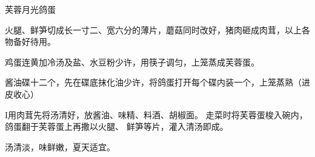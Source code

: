 \begin{recipe}{芙蓉月光鸽蛋}

\ingredients


\cooking

\step 火腿、鲜笋切成长一寸二、宽六分的薄片，蘑菇同时改好，猪肉砸成肉茸，以上各物备好待用。

\step 鸡蛋连黄加冷汤及盐、水豆粉少许，用筷子调匀，上笼蒸成芙蓉蛋。

\step 酱油碟十二个，先在碟底抹化油少许，将鸽蛋打开每个碟内装一个，上笼蒸熟（进皮收心）

I用肉茸先将汤清好，放酱油、味精、料酒、胡椒面。 走菜时将芙蓉蛋梭入碗内，鸽蛋翻于芙蓉蛋上再撒以火腿、 鲜笋等片，灌入清汤即成。

\notes

汤清淡，味鲜嫩，夏天适宜。

\end{recipe}

